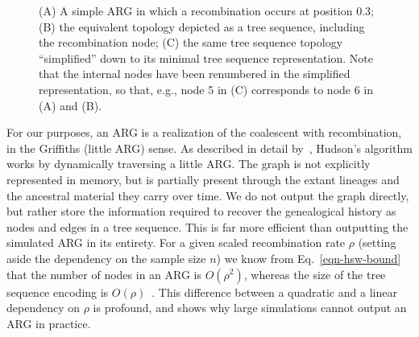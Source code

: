 \documentclass[9pt,twocolumn,twoside,lineno]{gsajnl}
\begin{document}
\begin{figure}
\begin{subfigure}[t]{0.33\textwidth}
\end{subfigure}
\caption{\label{fig-arg} (A) A simple ARG in which a recombination
occurs at position 0.3; (B) the equivalent topology depicted as a tree
sequence, including the recombination node; (C) the same tree sequence
topology ``simplified'' down to its minimal tree sequence representation.
Note that the internal nodes have been renumbered in the simplified
representation, so that, e.g., node 5 in (C) corresponds to node 6 in
(A) and (B).}
\end{figure}

For our purposes, an ARG is a realization of the coalescent with
recombination, in the Griffiths (little ARG) sense.
As described in detail by~\cite{kelleher2016efficient}, Hudson's algorithm
works by dynamically traversing a little ARG.
The graph is not explicitly represented in memory, but is partially
present through the extant lineages and the ancestral material they carry
over time. We do not output the graph directly, but
rather store the information required to recover the genealogical
history as nodes and edges in a tree sequence.
This is far more efficient than outputting the simulated ARG in its entirety.
For a given scaled recombination rate $\rho$
(setting aside the dependency on the sample size $n$)
we know from Eq.~\eqref{eqn-hsw-bound} that the number of nodes
in an ARG is $O(\rho^2)$,
whereas the size of the tree sequence encoding is
$O(\rho)$~\citep{kelleher2016efficient}.
This difference between a
quadratic and a linear dependency on $\rho$ is profound, and shows why
large simulations cannot output an ARG in practice.
\end{document}
